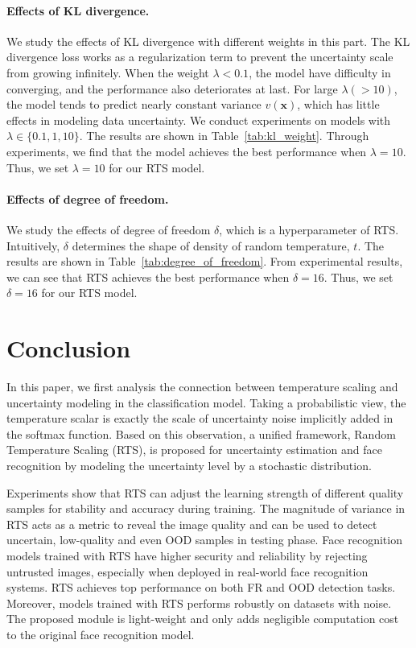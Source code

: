 \documentclass[letterpaper]{article} %
\begin{document}
\paragraph{Effects of KL divergence.} We study the effects of KL divergence with different weights in this part.
The KL divergence loss works as a regularization term to prevent the uncertainty scale from growing infinitely. When the weight $\lambda < 0.1$, the model have difficulty in converging, and the performance also deteriorates at last.
For large $\lambda (>10)$, the model tends to predict nearly constant variance $v(\bm{x})$, which has little effects in modeling data uncertainty.
We conduct experiments on models with $\lambda \in \{0.1, 1, 10\}$. The results are shown in Table~\ref{tab:kl_weight}.
Through experiments, we find that the model achieves the best performance when $\lambda = 10$. Thus, we set $\lambda = 10$ for our RTS model.

\paragraph{Effects of degree of freedom.} We study the effects of degree of freedom $\delta$, which is a hyperparameter of RTS. Intuitively, $\delta$ determines the shape of density of random temperature, $t$. The results are shown in Table~\ref{tab:degree_of_freedom}. From experimental results, we can see that RTS achieves the best performance when $\delta = 16$. Thus, we set $\delta = 16$ for our RTS model.



\section{Conclusion}
\label{sec:conclusion}

In this paper, we first analysis the connection between temperature scaling and uncertainty modeling in the classification model. Taking a probabilistic view, the temperature scalar is exactly the scale of uncertainty noise implicitly added in the softmax function. Based on this observation, a unified framework, Random Temperature Scaling (RTS), is proposed for uncertainty estimation and face recognition by modeling the uncertainty level by a stochastic distribution.

Experiments show that RTS can adjust the learning strength of different quality samples for stability and accuracy during training. The magnitude of variance in RTS acts as a metric to reveal the image quality and can be used to detect uncertain, low-quality and even OOD samples in testing phase.
Face recognition models trained with RTS have higher security and reliability by rejecting untrusted images, especially when deployed in real-world face recognition systems. RTS achieves top performance on both FR and OOD detection tasks. Moreover, models trained with RTS performs robustly on datasets with noise. The proposed module is light-weight and only adds negligible computation cost to the original face recognition model.
\end{document}
